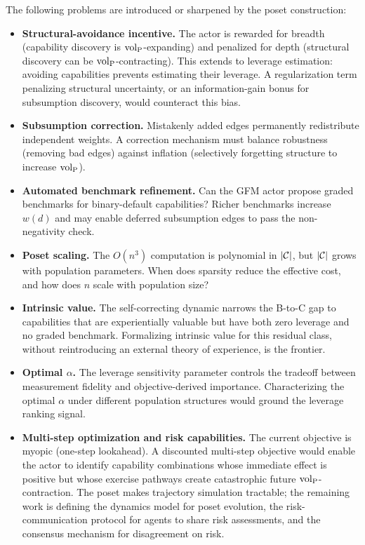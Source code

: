 The following problems are introduced or sharpened by the poset construction:

\begin{itemize}
\item \textbf{Structural-avoidance incentive.} The actor is rewarded for
  breadth (capability discovery is ${\operatorname{vol}_{\mathrm{P}}}$-expanding) and penalized for depth
  (structural discovery can be ${\operatorname{vol}_{\mathrm{P}}}$-contracting). This extends to leverage
  estimation: avoiding capabilities prevents estimating their leverage. A
  regularization term penalizing structural uncertainty, or an
  information-gain bonus for subsumption discovery, would counteract this bias.
\item \textbf{Subsumption correction.} Mistakenly added edges permanently
  redistribute independent weights. A correction mechanism must balance
  robustness (removing bad edges) against inflation (selectively forgetting
  structure to increase ${\operatorname{vol}_{\mathrm{P}}}$).
\item \textbf{Automated benchmark refinement.} Can the GFM actor propose
  graded benchmarks for binary-default capabilities? Richer benchmarks
  increase $w(d)$ and may enable deferred subsumption edges to pass the
  non-negativity check.
\item \textbf{Poset scaling.} The $O(n^3)$ computation is polynomial in
  $|\mathcal{C}|$, but $|\mathcal{C}|$ grows with population parameters. When does sparsity
  reduce the effective cost, and how does $n$ scale with population size?
\item \textbf{Intrinsic value.} The self-correcting dynamic narrows the
  B-to-C gap to capabilities that are experientially valuable but have both
  zero leverage and no graded benchmark. Formalizing intrinsic value for this
  residual class, without reintroducing an external theory of experience,
  is the frontier.
\item \textbf{Optimal $\alpha$.} The leverage sensitivity parameter controls
  the tradeoff between measurement fidelity and objective-derived importance.
  Characterizing the optimal $\alpha$ under different population structures
  would ground the leverage ranking signal.
\item \textbf{Multi-step optimization and risk capabilities.} The current
  objective is myopic (one-step lookahead). A discounted multi-step objective
  would enable the actor to identify capability combinations whose immediate
  effect is positive but whose exercise pathways create catastrophic future
  ${\operatorname{vol}_{\mathrm{P}}}$-contraction. The poset makes trajectory simulation tractable; the
  remaining work is defining the dynamics model for poset evolution, the
  risk-communication protocol for agents to share risk assessments, and the
  consensus mechanism for disagreement on risk.
\end{itemize}
